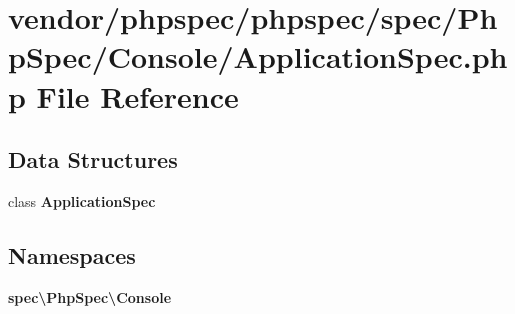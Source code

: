 \section{vendor/phpspec/phpspec/spec/\+Php\+Spec/\+Console/\+Application\+Spec.php File Reference}
\label{_application_spec_8php}
\subsection*{Data Structures}
\begin{DoxyCompactItemize}
\item 
class {\bf Application\+Spec}
\end{DoxyCompactItemize}
\subsection*{Namespaces}
\begin{DoxyCompactItemize}
\item 
 {\bf spec\textbackslash{}\+Php\+Spec\textbackslash{}\+Console}
\end{DoxyCompactItemize}
